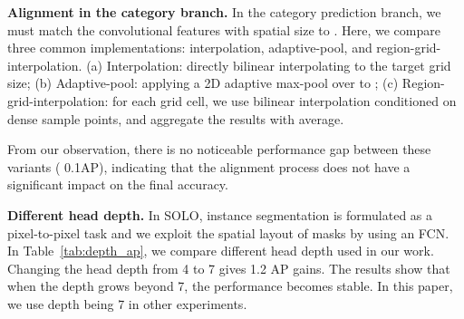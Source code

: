 \documentclass[runningheads]{llncs}
\def\OurMethod{{SOLO}\xspace}
\newcommand{\myparagraph}[1]{{ \noindent \bf #1}}
\begin{document}
\myparagraph{Alignment in the category branch.}
In the category prediction branch, we must match the convolutional features with spatial size  to . Here, we compare three common implementations: interpolation, adaptive-pool, and region-grid-interpolation. (a) Interpolation: directly bilinear interpolating to the target grid size; (b) Adaptive-pool: applying a 2D adaptive max-pool over  to ; (c) Region-grid-interpolation: for each grid cell, we use bilinear interpolation conditioned on dense sample points, and aggregate the results with average.
\iffalse
\begin{itemize}
\itemsep -0.0051cm
    \item Interpolation: Directly bilinear interpolating to the target grid size;
    \item Adaptive-pool: Applying a 2D adaptive max-pool over  to ;
    \item Region-grid-interpolation: For each grid cell, we use bilinear interpolation conditioned on dense sample points, and aggregate the results with average.
\end{itemize}
\fi
From our observation, there is no noticeable performance gap between these variants ( 0.1AP), indicating that the alignment process
does not have a significant impact on the final accuracy.







\myparagraph{Different head depth.}
In \OurMethod, instance segmentation is formulated as a pixel-to-pixel task and we exploit the spatial layout of masks by using an FCN. In Table~\ref{tab:depth_ap}, we compare different head depth used in our work. Changing the head depth from 4 to 7 gives 1.2 AP gains.  The results show that when the depth grows beyond 7, the performance becomes stable. In this paper, we  use depth being 7 in other experiments.

\begin{table}[h]
    \centering
     \caption{\textbf{Different head depth.} We  use depth being 7 in other experiments, as the performance becomes stable when the depth grows beyond 7.}
     \label{tab:depth_ap}
\end{table}
\end{document}
